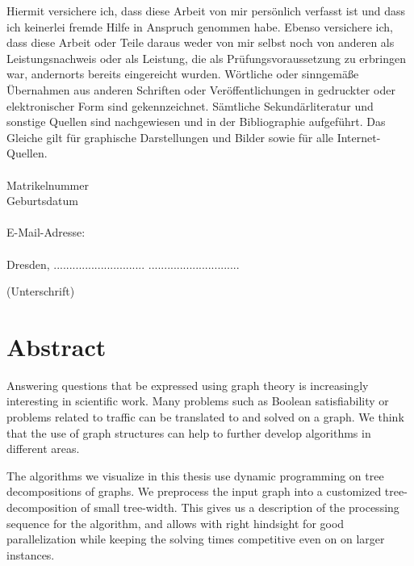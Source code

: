 \documentclass[a4paper, 12pt, bibliography=totoc]{scrartcl}
\begin{document}
\noindent
Hiermit versichere ich, dass diese Arbeit von mir persönlich verfasst ist und dass ich
keinerlei fremde Hilfe in Anspruch genommen habe. Ebenso versichere ich, dass diese Arbeit
oder Teile daraus weder von mir selbst noch von anderen als Leistungsnachweis oder als Leistung, die als Prüfungsvoraussetzung
zu erbringen war, andernorts bereits eingereicht wurden. Wörtliche oder sinngemäße Übernahmen aus anderen Schriften
oder Veröffentlichungen in gedruckter oder elektronischer Form sind gekennzeichnet.
Sämtliche Sekundärliteratur und sonstige Quellen sind nachgewiesen und in der Bibliographie aufgeführt.
Das Gleiche gilt für graphische Darstellungen und Bilder sowie für alle Internet-Quellen. \\[20pt]

\noindent
\myauthor \\
Matrikelnummer \mymatriculation\\
Geburtsdatum \mybirthday\\\\
E-Mail-Adresse:\\
 \myemail\\[40pt]


Dresden,  ............................. \hfill .............................
\begin{flushright}
	(Unterschrift)\hspace{1em}
\end{flushright}


\newpage

\section*{Abstract}
\vspace{4ex}

Answering questions that be expressed using graph theory is increasingly interesting in scientific work.
Many problems such as Boolean satisfiability or problems related to traffic can be translated to and solved on a graph.
We think that the use of graph structures can help to further develop algorithms in different areas.

The algorithms we visualize in this thesis use dynamic programming on tree decompositions of graphs.
We preprocess the input graph into a customized tree-decomposition of small tree-width.
This gives us a description of the processing sequence for the algorithm, and allows 
with right hindsight for good parallelization while keeping the solving times competitive even on on larger instances.
\end{document}
